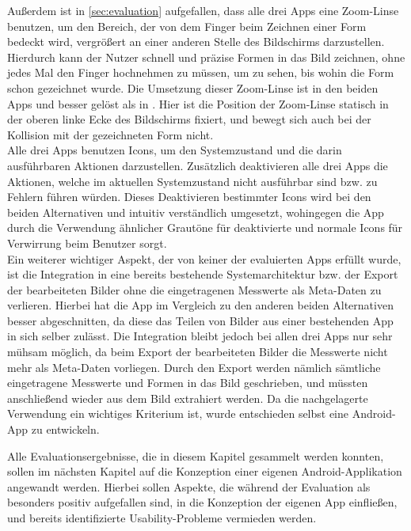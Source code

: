 Außerdem ist in \autoref{sec:evaluation} aufgefallen, dass alle drei Apps eine Zoom-Linse benutzen, um den Bereich, der von dem Finger beim Zeichnen einer Form bedeckt wird, vergrößert an einer anderen Stelle des Bildschirms darzustellen.
Hierdurch kann der Nutzer schnell und präzise Formen in das Bild zeichnen, ohne jedes Mal den Finger hochnehmen zu müssen, um zu sehen, bis wohin die Form schon gezeichnet wurde.
Die Umsetzung dieser Zoom-Linse ist in den beiden Apps \mm{} und \pm{} besser gelöst als in \im{}.
Hier ist die Position der Zoom-Linse statisch in der oberen linke Ecke des Bildschirms fixiert, und bewegt sich auch bei der Kollision mit der gezeichneten Form nicht. \\

Alle drei Apps benutzen Icons, um den Systemzustand und die darin ausführbaren Aktionen darzustellen.
Zusätzlich deaktivieren alle drei Apps die Aktionen, welche im aktuellen Systemzustand nicht ausführbar sind bzw. zu Fehlern führen würden.
Dieses Deaktivieren bestimmter Icons wird bei den beiden Alternativen \mm{} und \pm{} intuitiv verständlich umgesetzt, wohingegen die App \im{} durch die Verwendung ähnlicher Grautöne für deaktivierte und normale Icons für Verwirrung beim Benutzer sorgt. \\

Ein weiterer wichtiger Aspekt, der von keiner der evaluierten Apps erfüllt wurde, ist die Integration in eine bereits bestehende Systemarchitektur bzw. der Export der bearbeiteten Bilder ohne die eingetragenen Messwerte als Meta-Daten zu verlieren. 
Hierbei hat die App \im{} im Vergleich zu den anderen beiden Alternativen besser abgeschnitten, da diese das Teilen von Bilder aus einer bestehenden App in sich selber zulässt.
Die Integration bleibt jedoch bei allen drei Apps nur sehr mühsam möglich, da beim Export der bearbeiteten Bilder die Messwerte nicht mehr als Meta-Daten vorliegen.
Durch den Export werden nämlich sämtliche eingetragene Messwerte und Formen in das Bild geschrieben, und müssten anschließend wieder aus dem Bild extrahiert werden.
Da die nachgelagerte Verwendung ein wichtiges Kriterium ist, wurde entschieden selbst eine Android-App zu entwickeln.

Alle Evaluationsergebnisse, die in diesem Kapitel gesammelt werden konnten, sollen im nächsten Kapitel auf die Konzeption einer eigenen Android-Applikation angewandt werden.
Hierbei sollen Aspekte, die während der Evaluation als besonders positiv aufgefallen sind, in die Konzeption der eigenen App einfließen, und bereits identifizierte Usability-Probleme vermieden werden.
